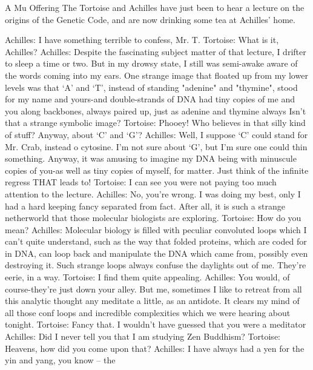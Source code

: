 
                                 A Mu Offering
   The Tortoise and Achilles have just been to hear a lecture on the origins of the
       Genetic Code, and are now drinking some tea at Achilles' home.

Achilles: I have something terrible to confess, Mr. T.
Tortoise: What is it, Achilles?
Achilles: Despite the fascinating subject matter of that lecture, I drifter to sleep a time or
   two. But in my drowsy state, I still was semi-awake aware of the words coming into
   my ears. One strange image that floated up from my lower levels was that `A' and `T',
   instead of standing "adenine" and "thymine", stood for my name and yours-and
   double-strands of DNA had tiny copies of me and you along backbones, always
   paired up, just as adenine and thymine always Isn't that a strange symbolic image?
Tortoise: Phooey! Who believes in that silly kind of stuff? Anyway, about `C' and `G'?
Achilles: Well, I suppose `C' could stand for Mr. Crab, instead o cytosine. I'm not sure
   about `G', but I'm sure one could thin something. Anyway, it was amusing to imagine
   my DNA being with minuscule copies of you-as well as tiny copies of myself, for
   matter. Just think of the infinite regress THAT leads to!
Tortoise: I can see you were not paying too much attention to the lecture.
Achilles: No, you're wrong. I was doing my best, only I had a hard keeping fancy
   separated from fact. After all, it is such a strange netherworld that those molecular
   biologists are exploring.
Tortoise: How do you mean?
Achilles: Molecular biology is filled with peculiar convoluted loops which I can't quite
   understand, such as the way that folded proteins, which are coded for in DNA, can
   loop back and manipulate the DNA which came from, possibly even destroying it.
   Such strange loops always confuse the daylights out of me. They're eerie, in a way.
Tortoise: I find them quite appealing.
Achilles: You would, of course-they're just down your alley. But me, sometimes I like to
   retreat from all this analytic thought any meditate a little, as an antidote. It clears my
   mind of all those conf loops and incredible complexities which we were hearing about
   tonight.
Tortoise: Fancy that. I wouldn't have guessed that you were a meditator
Achilles: Did I never tell you that I am studying Zen Buddhism?
Tortoise: Heavens, how did you come upon that?
Achilles: I have always had a yen for the yin and yang, you know – the




